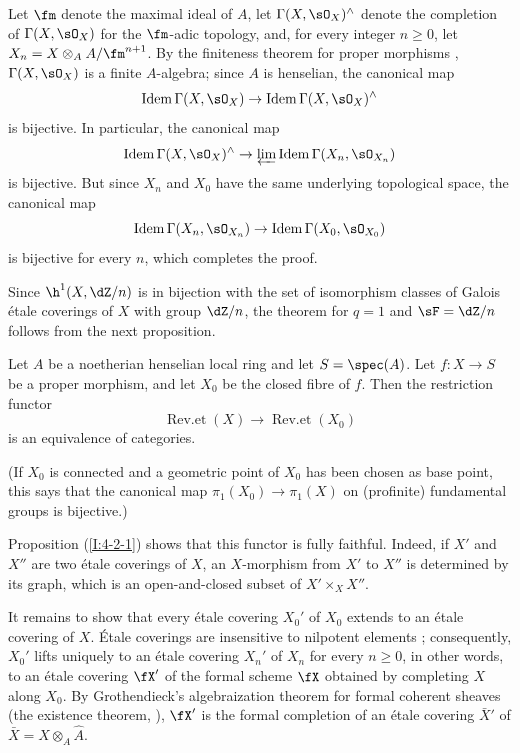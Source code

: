 \documentclass[oneside]{book}
\begin{document}
Let $\fm$ denote the maximal ideal of $A$, let
$\Gamma(X,\sO_X)^\wedge$ denote the completion of $\Gamma(X,\sO_X)$
for the $\fm$-adic topology, and, for every integer $n\geqslant0$, let
$X_n=X\otimes_AA/\fm^{n+1}$. By the finiteness theorem for proper
morphisms \cite[III.3.2]{ega}, $\Gamma(X,\sO_X)$ is a finite
$A$-algebra; since $A$ is henselian, the canonical map
\[
  \operatorname{Idem} \Gamma(X,\sO_X) \to \operatorname{Idem}\Gamma(X,\sO_X)^\wedge
\]
is bijective. In particular, the canonical map
\[
  \operatorname{Idem} \Gamma(X,\sO_X)^\wedge \to \varprojlim \operatorname{Idem}\Gamma(X_n,\sO_{X_n})
\]
is bijective. But since $X_n$ and $X_0$ have the same underlying
topological space, the canonical map
\[
  \operatorname{Idem}\Gamma(X_n,\sO_{X_n}) \to \operatorname{Idem} \Gamma(X_0,\sO_{X_0})
\]
is bijective for every $n$, which completes the proof.

Since $\h^1(X,\dZ/n)$ is in bijection with the set of isomorphism classes
of Galois étale coverings of $X$ with group $\dZ/n$, the theorem for
$q=1$ and $\sF=\dZ/n$ follows from the next proposition.

\begin{proposition}\label{I:4-2-2}
Let $A$ be a noetherian henselian local ring and let $S=\spec(A)$. Let
$f:X\to S$ be a proper morphism, and let $X_0$ be the closed fibre of $f$. Then
the restriction functor
\[
  \operatorname{Rev.et}(X) \to \operatorname{Rev.et}(X_0)
\]
is an equivalence of categories.
\end{proposition}

(If $X_0$ is connected and a geometric point of $X_0$ has been chosen
as base point, this says that the canonical map
$\pi_1(X_0)\to\pi_1(X)$ on (profinite) fundamental groups is bijective.)

Proposition (\ref{I:4-2-1}) shows that this functor is fully faithful.
Indeed, if $X'$ and $X''$ are two étale coverings of $X$, an
$X$-morphism from $X'$ to $X''$ is determined by its graph, which is an
open-and-closed subset of $X'\times_XX''$.

It remains to show that every étale covering $X_0'$ of $X_0$ extends to
an étale covering of $X$. Étale coverings are insensitive to nilpotent
elements \cite[ch.1]{sga1}; consequently, $X_0'$ lifts uniquely to an
étale covering $X_n'$ of $X_n$ for every $n\geqslant0$, in other words,
to an étale covering $\fX'$ of the formal scheme $\fX$ obtained by
completing $X$ along $X_0$. By Grothendieck's algebraization theorem for
formal coherent sheaves (the existence theorem, \cite[III.5]{ega}),
$\fX'$ is the formal completion of an étale covering $\bar X'$ of
$\bar X=X\otimes_A\hat A$.
\end{document}
